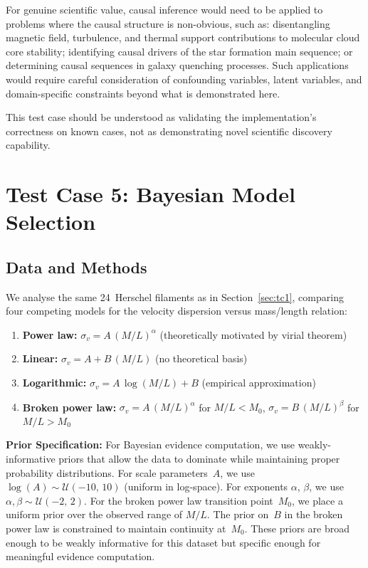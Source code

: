 \documentclass[fleqn,usenatbib]{mnras}
\begin{document}
For genuine scientific value, causal inference would need to be applied to problems where the causal structure is non-obvious, such as: disentangling magnetic field, turbulence, and thermal support contributions to molecular cloud core stability; identifying causal drivers of the star formation main sequence; or determining causal sequences in galaxy quenching processes.
Such applications would require careful consideration of confounding variables, latent variables, and domain-specific constraints beyond what is demonstrated here.

This test case should be understood as validating the implementation's correctness on known cases, not as demonstrating novel scientific discovery capability.

\section{Test Case 5: Bayesian Model Selection}
\label{sec:tc5}

\subsection{Data and Methods}
\label{sec:tc5:data}

We analyse the same 24~Herschel filaments as in Section~\ref{sec:tc1}, comparing four competing models for the velocity dispersion versus mass/length relation:
\begin{enumerate}
  \item[(i)] \textbf{Power law:} $\sigma_v = A\,(M/L)^{\alpha}$ (theoretically motivated by virial theorem)
  \item[(ii)] \textbf{Linear:} $\sigma_v = A + B\,(M/L)$ (no theoretical basis)
  \item[(iii)] \textbf{Logarithmic:} $\sigma_v = A\,\log(M/L) + B$ (empirical approximation)
  \item[(iv)] \textbf{Broken power law:} $\sigma_v = A\,(M/L)^{\alpha}$ for $M/L < M_0$, $\sigma_v = B\,(M/L)^{\beta}$ for $M/L > M_0$
\end{enumerate}

\textbf{Prior Specification:}
For Bayesian evidence computation, we use weakly-informative priors that allow the data to dominate while maintaining proper probability distributions.
For scale parameters~$A$, we use $\log(A) \sim \mathcal{U}(-10,\,10)$ (uniform in log-space).
For exponents $\alpha$, $\beta$, we use $\alpha, \beta \sim \mathcal{U}(-2,\,2)$.
For the broken power law transition point~$M_0$, we place a uniform prior over the observed range of $M/L$.
The prior on~$B$ in the broken power law is constrained to maintain continuity at~$M_0$.
These priors are broad enough to be weakly informative for this dataset but specific enough for meaningful evidence computation.
\end{document}
